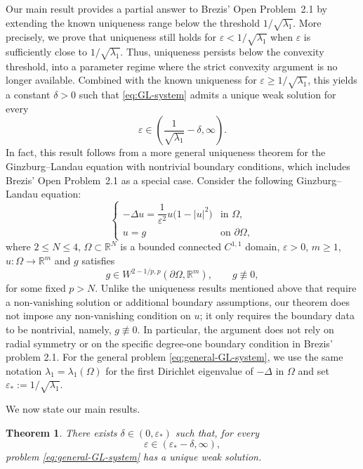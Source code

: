 \documentclass[11pt]{amsart}
\newtheorem{theorem}{Theorem}[section]
\theoremstyle{definition}
\theoremstyle{plain}
\newcommand{\abs}[1]{\lvert#1\rvert}
\newcommand{\R}{\mathbb{R}}
\numberwithin{equation}{section}
\begin{document}
Our main result provides a partial answer to Brezis' Open Problem~2.1 by extending the known uniqueness range below the threshold $1/\sqrt{\lambda_1}$. More precisely, we prove that uniqueness still holds for $\varepsilon<1/\sqrt{\lambda_1}$ when $\varepsilon$ is sufficiently close to $1/\sqrt{\lambda_1}$. Thus, uniqueness persists below the convexity threshold, into a parameter regime where the strict convexity argument is no longer available. Combined with the known uniqueness for $\varepsilon\geq1/\sqrt{\lambda_1}$, this yields a constant $\delta>0$ such that \eqref{eq:GL-system} admits a unique weak solution for every
\[
\varepsilon\in\left(\frac{1}{\sqrt{\lambda_1}}-\delta,\infty\right).
\]
In fact, this result follows from a more general uniqueness theorem for the Ginzburg--Landau equation with nontrivial boundary conditions, which includes Brezis' Open Problem~2.1 as a special case. Consider the following Ginzburg--Landau equation:
\begin{equation}\label{eq:general-GL-system}
	\begin{cases}
		-\Delta u
		=
		\dfrac{1}{\varepsilon^2}
		u\bigl(1-\abs{u}^2\bigr)
		& \text{in } \Omega,\\[2mm]
		u=g
		& \text{on } \partial\Omega,
	\end{cases}
\end{equation}
where $2\leq N\leq4$, $\Omega\subset\R^N$ is a bounded connected
$C^{1,1}$ domain, $\varepsilon>0$, $m\geq1$, 
$u\colon\Omega\to\R^m$  and $g$ satisfies
\[
	g\in W^{2-1/p,p}(\partial\Omega, \R^m),
	\qquad
	g\not\equiv0,
\]
for some fixed $p>N$. Unlike the uniqueness results mentioned above that require a non-vanishing solution or additional boundary assumptions, our theorem does not impose any non-vanishing condition on $u$; it only requires the boundary data to be nontrivial, namely, $g\not\equiv0$. In particular, the argument does not rely on radial symmetry or on the specific degree-one boundary condition in Brezis' problem 2.1. For the general problem \eqref{eq:general-GL-system}, we use the same notation
$\lambda_1=\lambda_1(\Omega)$ for the first Dirichlet eigenvalue
of $-\Delta$ in $\Omega$ and set
$\varepsilon_*:=1/\sqrt{\lambda_1}$.

We now state our main results.

\begin{theorem}\label{thm:general-uniqueness}
	There exists $\delta\in(0,\varepsilon_*)$ such that, for every
	\[
		\varepsilon\in
		\left(\varepsilon_*-\delta,\infty\right),
	\]
problem \eqref{eq:general-GL-system} has a unique weak solution.
\end{theorem}
\end{document}
